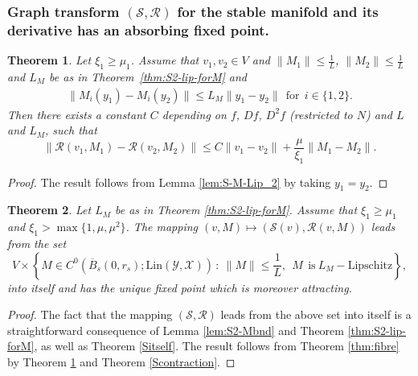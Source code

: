 \documentclass[11pt, leqno]{amsart}
\newtheorem{thm}{Theorem}[section]
\theoremstyle{definition}
\begin{document}
\subsubsection{Graph transform  $(\mathcal{S}, \mathcal{R})$ for the stable manifold and its derivative has an absorbing fixed point.}
\begin{thm}\label{contraction_stable}
Let $\xi_1 \geq \mu_1$. Assume that  $v_1,v_2 \in V$ and $\|M_1\| \leq \frac{1}{L}$, $\|M_2\| \leq \frac{1}{L}$ and $L_M$ be as in Theorem~\ref{thm:S2-lip-forM} and
\begin{eqnarray}
  \|M_i(y_1) - M_i(y_2)\| \leq L_M \|y_1 - y_2\|\ \ \textrm{for}\ \ i\in \{1,2\}.
\end{eqnarray}
Then there exists a constant $C$ depending on  $f$, $Df$, $D^2f$ (restricted to $N$) and $L$ and $L_M$, such that
\begin{equation}
  \|\mathcal{R}(v_1,M_1) - \mathcal{R}(v_2,M_2)\| \leq C \|v_1 - v_2\| + \frac{\mu}{\xi_1} \|M_1 - M_2\|.
\end{equation}
\end{thm}
\begin{proof}
	The result follows from Lemma \ref{lem:S-M-Lip_2} by taking  $y_1 = y_2.$
	\end{proof}

\begin{thm}\label{thm:25}
	Let $L_M$ be as in Theorem \ref{thm:S2-lip-forM}. Assume that $\xi_1 \geq \mu_1$ and $\xi_1 > \max\{1, \mu, \mu^2\}$.
	The mapping $(v,M)\mapsto (\mathcal{S}(v),\mathcal{R}(v,M))$ leads from the set
$$
V \times \left\{ M\in C^0(\overline{B}_s(0,r_s);\mathrm{Lin}(\mathcal{Y},\mathcal{X}))\,:\ \|M\| \leq \frac{1}{L},\ \  M\ \  \mathrm{is}\ L_M-\mathrm{Lipschitz} \right\},
$$
into itself and has the unique fixed point which is moreover attracting.
\end{thm}
\begin{proof}
	The fact that the mapping $(\mathcal{S}, \mathcal{R})$ leads from the above set into itself is a straightforward consequence of Lemma \ref{lem:S2-Mbnd} and Theorem \ref{thm:S2-lip-forM}, as well as Theorem \ref{Sitself}. The result follows from Theorem \ref{thm:fibre} by Theorem \ref{contraction_stable} and Theorem \ref{Scontraction}.
\end{proof}
\end{document}
